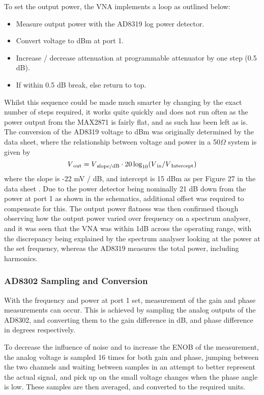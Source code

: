 To set the output power, the VNA implements a loop as outlined below:
\begin{itemize}
	\item Measure output power with the AD8319 log power detector.
	\item Convert voltage to dBm at port 1.
	\item Increase / decrease attenuation at programmable attenuator by one step (0.5 dB).
	\item If within 0.5 dB break, else return to top. 
\end{itemize}
Whilst this sequence could be made much smarter by changing by the exact number of steps required, it works quite quickly and does not run often as the power output from the MAX2871 is fairly flat, and as such has been left as is. The conversion of the AD8319 voltage to dBm was originally determined by the data sheet, where the relationship between voltage and power in a 50$\Omega$ system is given by $$ V\textsubscript{out} = V\textsubscript{slope/dB} \cdot  20\log_{10}(V\textsubscript{in} / V\textsubscript{Intercept}) $$ where the slope is -22 mV / dB, and intercept is 15 dBm as per Figure 27 in the data sheet \cite{ad8319}. Due to the power detector being nominally 21 dB down from the power at port 1 as shown in the schematics, additional offset was required to compensate for this. The output power flatness was then confirmed though observing how the output power varied over frequency on a spectrum analyser, and it was seen that the VNA was within 1dB across the operating range, with the discrepancy being explained by the spectrum analyser looking at the power at the set frequency, whereas the AD8319 measures the total power, including harmonics. 

\subsubsection{AD8302 Sampling and Conversion}
With the frequency and power at port 1 set, measurement of the gain and phase measurements can occur. This is achieved by sampling the analog outputs of the AD8302, and converting them to the gain difference in dB, and phase difference in degrees respectively. 

To decrease the influence of noise and to increase the ENOB of the measurement, the analog voltage is sampled 16 times for both gain and phase, jumping between the two channels and waiting between samples in an attempt to better represent the actual signal, and pick up on the small voltage changes when the phase angle is low. These samples are then averaged, and converted to the required units. 

